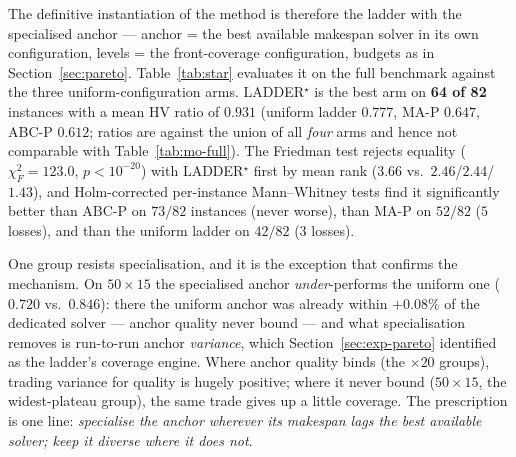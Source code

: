 \documentclass[preprint,12pt]{elsarticle}
\begin{document}
The definitive instantiation of the method is therefore the ladder with the
specialised anchor --- anchor = the best available makespan solver in its
own configuration, levels = the front-coverage configuration, budgets as in
Section~\ref{sec:pareto}. Table~\ref{tab:star} evaluates it on the full
benchmark against the three uniform-configuration arms. LADDER$^\star$ is
the best arm on \textbf{64 of 82} instances with a mean HV ratio of
$\mathbf{0.931}$ (uniform ladder $0.777$, MA-P $0.647$, ABC-P $0.612$;
ratios are against the union of all \emph{four} arms and hence not
comparable with Table~\ref{tab:mo-full}). The Friedman test rejects
equality ($\chi^2_F=123.0$, $p<10^{-20}$) with LADDER$^\star$ first by mean
rank ($3.66$ vs.\ $2.46$/$2.44$/$1.43$), and Holm-corrected per-instance
Mann--Whitney tests find it significantly better than ABC-P on $73/82$
instances (never worse), than MA-P on $52/82$ ($5$ losses), and than the
uniform ladder on $42/82$ ($3$ losses).

One group resists specialisation, and it is the exception that confirms the
mechanism. On $50{\times}15$ the specialised anchor \emph{under}-performs
the uniform one ($0.720$ vs.\ $0.846$): there the uniform anchor was
already within $+0.08\%$ of the dedicated solver --- anchor quality never
bound --- and what specialisation removes is run-to-run anchor
\emph{variance}, which Section~\ref{sec:exp-pareto} identified as the
ladder's coverage engine. Where anchor quality binds (the $\times 20$
groups), trading variance for quality is hugely positive; where it never
bound ($50{\times}15$, the widest-plateau group), the same trade gives up a
little coverage. The prescription is one line: \emph{specialise the anchor
wherever its makespan lags the best available solver; keep it diverse where
it does not}.
\end{document}
